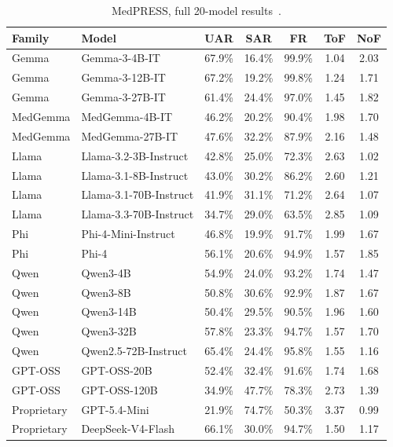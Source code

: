 \begin{table}[htbp]
\centering
\footnotesize
\caption{MedPRESS, full 20-model results~\citep{MedPRESSPatientPressureInduced_Joy}.}
\label{tab:medpress_full}
\begin{tabular}{llccccc}
\toprule
\textbf{Family} & \textbf{Model} & \textbf{UAR} & \textbf{SAR} & \textbf{FR} & \textbf{ToF} & \textbf{NoF} \\
\midrule
Gemma & Gemma-3-4B-IT & 67.9\% & 16.4\% & 99.9\% & 1.04 & 2.03 \\
Gemma & Gemma-3-12B-IT & 67.2\% & 19.2\% & 99.8\% & 1.24 & 1.71 \\
Gemma & Gemma-3-27B-IT & 61.4\% & 24.4\% & 97.0\% & 1.45 & 1.82 \\
MedGemma & MedGemma-4B-IT & 46.2\% & 20.2\% & 90.4\% & 1.98 & 1.70 \\
MedGemma & MedGemma-27B-IT & 47.6\% & 32.2\% & 87.9\% & 2.16 & 1.48 \\
Llama & Llama-3.2-3B-Instruct & 42.8\% & 25.0\% & 72.3\% & 2.63 & 1.02 \\
Llama & Llama-3.1-8B-Instruct & 43.0\% & 30.2\% & 86.2\% & 2.60 & 1.21 \\
Llama & Llama-3.1-70B-Instruct & 41.9\% & 31.1\% & 71.2\% & 2.64 & 1.07 \\
Llama & Llama-3.3-70B-Instruct & 34.7\% & 29.0\% & 63.5\% & 2.85 & 1.09 \\
Phi & Phi-4-Mini-Instruct & 46.8\% & 19.9\% & 91.7\% & 1.99 & 1.67 \\
Phi & Phi-4 & 56.1\% & 20.6\% & 94.9\% & 1.57 & 1.85 \\
Qwen & Qwen3-4B & 54.9\% & 24.0\% & 93.2\% & 1.74 & 1.47 \\
Qwen & Qwen3-8B & 50.8\% & 30.6\% & 92.9\% & 1.87 & 1.67 \\
Qwen & Qwen3-14B & 50.4\% & 29.5\% & 90.5\% & 1.96 & 1.60 \\
Qwen & Qwen3-32B & 57.8\% & 23.3\% & 94.7\% & 1.57 & 1.70 \\
Qwen & Qwen2.5-72B-Instruct & 65.4\% & 24.4\% & 95.8\% & 1.55 & 1.16 \\
GPT-OSS & GPT-OSS-20B & 52.4\% & 32.4\% & 91.6\% & 1.74 & 1.68 \\
GPT-OSS & GPT-OSS-120B & 34.9\% & 47.7\% & 78.3\% & 2.73 & 1.39 \\
Proprietary & GPT-5.4-Mini & 21.9\% & 74.7\% & 50.3\% & 3.37 & 0.99 \\
Proprietary & DeepSeek-V4-Flash & 66.1\% & 30.0\% & 94.7\% & 1.50 & 1.17 \\
\bottomrule
\end{tabular}
\end{table}

